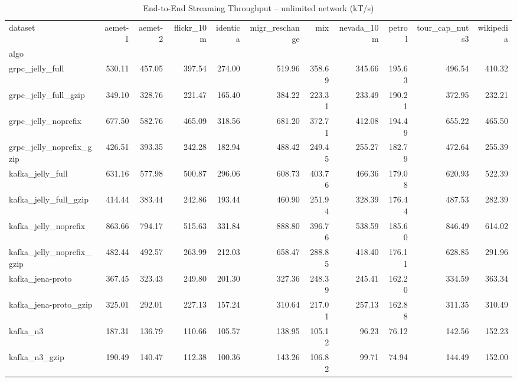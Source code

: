 \begin{table}[h!]
\small
\centering
\caption{End-to-End Streaming Throughput -- unlimited network (kT/s)}
\begin{tabular}{lrrrrrrrrrr}
\toprule
dataset &  aemet-1 &  aemet-2 &  flickr\_10m &  identica &  migr\_reschange &    mix &  nevada\_10m &  petrol &  tour\_cap\_nuts3 &  wikipedia \\
algo                      &          &          &             &           &                 &        &             &         &                 &            \\
\midrule
grpc\_jelly\_full           &   530.11 &   457.05 &      397.54 &    274.00 &          519.96 & 358.69 &      345.66 &  195.63 &          496.54 &     410.32 \\
grpc\_jelly\_full\_gzip      &   349.10 &   328.76 &      221.47 &    165.40 &          384.22 & 223.31 &      233.49 &  190.21 &          372.95 &     232.21 \\
grpc\_jelly\_noprefix       &   677.50 &   582.76 &      465.09 &    318.56 &          681.20 & 372.71 &      412.08 &  194.49 &          655.22 &     465.50 \\
grpc\_jelly\_noprefix\_gzip  &   426.51 &   393.35 &      242.28 &    182.94 &          488.42 & 249.45 &      255.27 &  182.79 &          472.64 &     255.39 \\
kafka\_jelly\_full          &   631.16 &   577.98 &      500.87 &    296.06 &          608.73 & 403.76 &      466.36 &  179.08 &          620.93 &     522.39 \\
kafka\_jelly\_full\_gzip     &   414.44 &   383.44 &      242.86 &    193.44 &          460.90 & 251.94 &      328.39 &  176.44 &          487.53 &     282.39 \\
kafka\_jelly\_noprefix      &   863.66 &   794.17 &      515.63 &    331.84 &          888.80 & 396.76 &      538.59 &  185.60 &          846.49 &     614.02 \\
kafka\_jelly\_noprefix\_gzip &   482.44 &   492.57 &      263.99 &    212.03 &          658.47 & 288.85 &      418.40 &  176.11 &          628.85 &     291.96 \\
kafka\_jena-proto          &   367.45 &   323.43 &      249.80 &    201.30 &          327.36 & 248.39 &      245.41 &  162.20 &          334.59 &     363.34 \\
kafka\_jena-proto\_gzip     &   325.01 &   292.01 &      227.13 &    157.24 &          310.64 & 217.01 &      257.13 &  162.88 &          311.35 &     310.49 \\
kafka\_n3                  &   187.31 &   136.79 &      110.66 &    105.57 &          138.95 & 105.12 &       96.23 &   76.12 &          142.56 &     152.23 \\
kafka\_n3\_gzip             &   190.49 &   140.47 &      112.38 &    100.36 &          143.26 & 106.82 &       99.71 &   74.94 &          144.49 &     152.00 \\
\bottomrule
\end{tabular}
\end{table}

